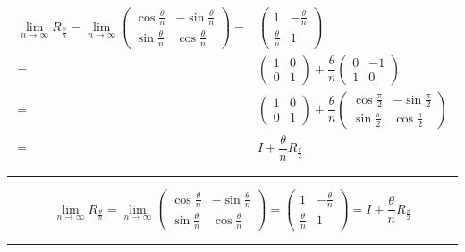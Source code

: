 \documentclass[
]{book}
\theoremstyle{definition}
\theoremstyle{definition}
\theoremstyle{definition}
\theoremstyle{definition}
\theoremstyle{remark}
\begin{document}
\[
\begin{aligned}
\lim_{n\rightarrow\infty}R_{{\scriptscriptstyle \frac{\theta}{n}}}=\lim_{n\rightarrow\infty}\begin{pmatrix}\cos\frac{\theta}{n} & -\sin\frac{\theta}{n}\\
\sin\frac{\theta}{n} & \cos\frac{\theta}{n}
\end{pmatrix}= & \begin{pmatrix}1 & -\frac{\theta}{n}\\
\frac{\theta}{n} & 1
\end{pmatrix}\\
= & \begin{pmatrix}1 & 0\\
0 & 1
\end{pmatrix}+\dfrac{\theta}{n}\begin{pmatrix}0 & -1\\
1 & 0
\end{pmatrix}\\
= & \begin{pmatrix}1 & 0\\
0 & 1
\end{pmatrix}+\dfrac{\theta}{n}\begin{pmatrix}\cos\frac{\pi}{2} & -\sin\frac{\pi}{2}\\
\sin\frac{\pi}{2} & \cos\frac{\pi}{2}
\end{pmatrix}\\
= & I+\dfrac{\theta}{n}R_{{\scriptscriptstyle \frac{\pi}{2}}}
\end{aligned}
\]

\begin{center}\rule{0.5\linewidth}{0.5pt}\end{center}

\[
\lim_{n\rightarrow\infty}R_{{\scriptscriptstyle \frac{\theta}{n}}}=\lim_{n\rightarrow\infty}\begin{pmatrix}\cos\frac{\theta}{n} & -\sin\frac{\theta}{n}\\
\sin\frac{\theta}{n} & \cos\frac{\theta}{n}
\end{pmatrix}=\begin{pmatrix}1 & -\frac{\theta}{n}\\
\frac{\theta}{n} & 1
\end{pmatrix}=I+\dfrac{\theta}{n}R_{{\scriptscriptstyle \frac{\pi}{2}}}
\]

\begin{center}\rule{0.5\linewidth}{0.5pt}\end{center}
\end{document}
